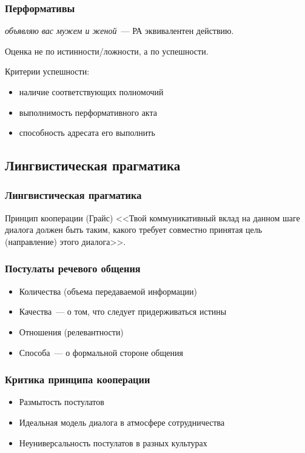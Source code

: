 \begin{frame}
  \frametitle{Перформативы}

  \textit{объявляю вас мужем и женой}~--- РА эквивалентен действию.

  Оценка не по истинности/ложности, а по успешности.

  \vfill

  Критерии успешности: \begin{itemize}
    \item наличие соответствующих полномочий
    \item выполнимость перформативного акта
    \item способность адресата его выполнить
  \end{itemize}
\end{frame}

\subsection{Лингвистическая прагматика}

\begin{frame}
  \frametitle{Лингвистическая прагматика}

  \begin{block}{Принцип кооперации (Грайс)}
    <<Твой коммуникативный вклад на данном шаге диалога должен быть таким,
    какого требует совместно принятая цель (направление) этого диалога>>.
  \end{block}
\end{frame}

\begin{frame}
  \frametitle{Постулаты речевого общения}

  \begin{itemize}
    \item Количества (объема передаваемой информации)
    \item Качества~--- о том, что следует придерживаться истины
    \item Отношения (релевантности)
    \item Способа~--- о формальной стороне общения
  \end{itemize}
\end{frame}

\begin{frame}
  \frametitle{Критика принципа кооперации}

  \begin{itemize}
    \item Размытость постулатов
    \item Идеальная модель диалога в атмосфере сотрудничества
    \item Неуниверсальность постулатов в разных культурах
  \end{itemize}
\end{frame}

